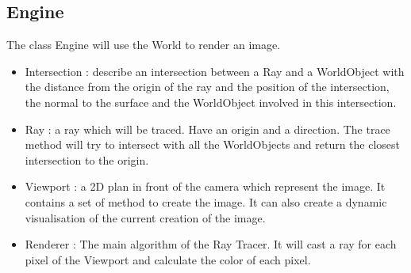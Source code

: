   \subsection{Engine}

The class Engine will use the World to render an image.

\begin{itemize}
  \item Intersection : describe an intersection between a Ray and a WorldObject with the distance from the origin of the ray and the position of the intersection, the normal to the surface and the WorldObject involved in this intersection.
  \item Ray : a ray which will be traced. Have an origin and a direction. The trace method will try to intersect with all the WorldObjects and return the closest intersection to the origin.
  \item Viewport : a 2D plan in front of the camera which represent the image. It contains a set of method to create the image. It can also create a dynamic visualisation of the current creation of the image.
  \item Renderer : The main algorithm of the Ray Tracer. It will cast a ray for each pixel of the Viewport and calculate the color of each pixel.
\end{itemize}

